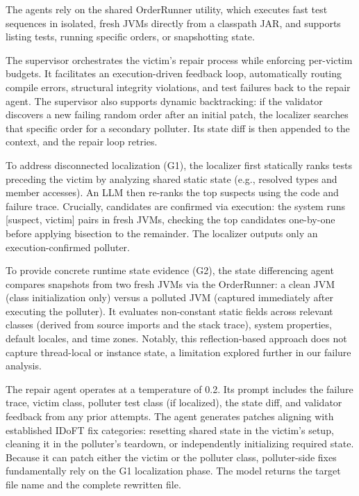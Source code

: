 \documentclass[conference]{IEEEtran}
\begin{document}
The agents rely on the shared OrderRunner utility, which executes fast test sequences in isolated, fresh JVMs directly from a classpath JAR, and supports listing tests, running specific orders, or snapshotting state.

The supervisor orchestrates the victim's repair process while enforcing per-victim budgets. It facilitates an execution-driven feedback loop, automatically routing compile errors, structural integrity violations, and test failures back to the repair agent. The supervisor also supports dynamic backtracking: if the validator discovers a new failing random order after an initial patch, the localizer searches that specific order for a secondary polluter. Its state diff is then appended to the context, and the repair loop retries. 

To address disconnected localization (G1), the localizer first statically ranks tests preceding the victim by analyzing shared static state (e.g., resolved types and member accesses). An LLM then re-ranks the top suspects using the code and failure trace. Crucially, candidates are confirmed via execution: the system runs [suspect, victim] pairs in fresh JVMs, checking the top candidates one-by-one before applying bisection to the remainder. The localizer outputs only an execution-confirmed polluter.

To provide concrete runtime state evidence (G2), the state differencing agent compares snapshots from two fresh JVMs via the OrderRunner: a clean JVM (class initialization only) versus a polluted JVM (captured immediately after executing the polluter). It evaluates non-constant static fields across relevant classes (derived from source imports and the stack trace), system properties, default locales, and time zones. Notably, this reflection-based approach does not capture thread-local or instance state, a limitation explored further in our failure analysis.

The repair agent operates at a temperature of 0.2. Its prompt includes the failure trace, victim class, polluter test class (if localized), the state diff, and validator feedback from any prior attempts. The agent generates patches aligning with established IDoFT fix categories: resetting shared state in the victim's setup, cleaning it in the polluter's teardown, or independently initializing required state. Because it can patch either the victim or the polluter class, polluter-side fixes fundamentally rely on the G1 localization phase. The model returns the target file name and the complete rewritten file.
\end{document}
